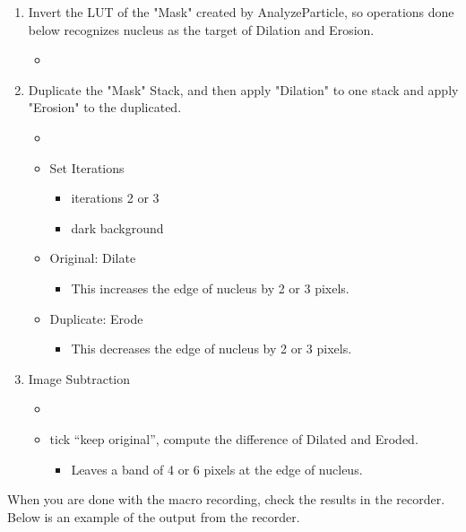 \begin{enumerate}
\begin{itemize}
  \end{itemize}
  \item Invert the LUT of the "Mask" created by AnalyzeParticle, so operations done below recognizes nucleus as the target of Dilation and Erosion. 
  \begin{itemize}
    \item {}
  \end{itemize}
  \item Duplicate the "Mask" Stack, and then apply "Dilation" to one stack and apply "Erosion" to the duplicated.
  \begin{itemize}
    \item {}
    \item Set Iterations 
    \begin{itemize}
      \item iterations 2 or 3
      \item dark background
    \end{itemize}
    \item Original: Dilate 
    \begin{itemize}
      \item This increases the edge of nucleus by 2 or 3 pixels. 
    \end{itemize}
    \item Duplicate: Erode 
    \begin{itemize}
      \item This decreases the edge of nucleus by 2 or 3 pixels. 
    \end{itemize}
  \end{itemize}
  \item Image Subtraction
  \begin{itemize}
    \item {}
    \item tick ``keep original'', compute the difference of Dilated and Eroded.
    \begin{itemize}
      \item Leaves a band of 4 or 6 pixels at the edge of nucleus. 
    \end{itemize} 
  \end{itemize}
\end{enumerate}

When you are done with the macro recording, check the results in the recorder. Below is an example of the output from the recorder. 

